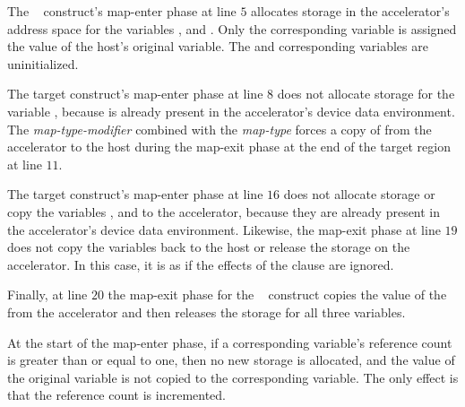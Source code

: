 The ~ construct's map-enter phase at line $5$ allocates
storage in the accelerator's address space for the variables ,  and .
Only the corresponding variable  is assigned the value of the host's
original  variable.  The  and  corresponding variables are
uninitialized.

The target construct's map-enter phase at line $8$ does not allocate storage
for the variable , because  is already present in the accelerator's device
data environment.  The  \emph{map-type-modifier} combined with the
 \emph{map-type} forces a copy of  from the accelerator to the host
during the map-exit phase at the end of the target region at line $11$.

The target construct's map-enter phase at line $16$ does not allocate storage
or copy the variables ,  and  to the accelerator, because they are
already present in the accelerator's device data environment.  Likewise, the
map-exit phase at line $19$ does not copy the variables back to the host or
release the storage on the accelerator.  In this case, it is as if the effects
of the  clause are ignored.

Finally, at line $20$ the map-exit phase for the ~
construct copies the value of the  from the accelerator and then releases
the storage for all three variables.



At the start of the map-enter phase, if a corresponding variable's
reference count is greater than or equal to one, then no new storage is allocated,
and the value of the original variable is not copied to the corresponding
variable.  The only effect is that the reference count is incremented.

